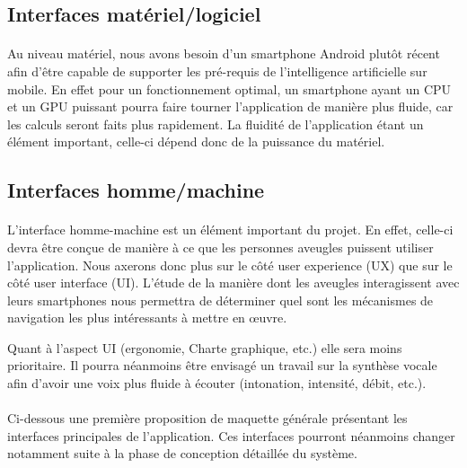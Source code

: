 \documentclass[CDS,UTF8,final]{EPURapport}
\begin{document}
\subsection{Interfaces matériel/logiciel}
\paragraph{}
Au niveau matériel, nous avons besoin d'un smartphone Android plutôt récent afin d'être capable de supporter les pré-requis de l'intelligence artificielle sur mobile. En effet pour un fonctionnement optimal, un smartphone ayant un CPU et un GPU puissant pourra faire tourner l'application de manière plus fluide, car les calculs seront faits plus rapidement. La fluidité de l'application étant un élément important, celle-ci dépend donc de la puissance du matériel.
 
\subsection{Interfaces homme/machine}
\paragraph{}
L'interface homme-machine est un élément important du projet. En effet, celle-ci devra être conçue de manière à ce que les personnes aveugles puissent utiliser l'application. Nous axerons donc plus sur le côté user experience (UX) que sur le côté user interface (UI). L'étude de la manière dont les aveugles interagissent avec leurs smartphones nous permettra de déterminer quel sont les mécanismes de navigation les plus intéressants à mettre en œuvre. \par
Quant à l'aspect UI (ergonomie, Charte graphique, etc.) elle sera moins prioritaire. Il pourra néanmoins être envisagé un travail sur la synthèse vocale afin d'avoir une voix plus fluide à écouter (intonation, intensité, débit, etc.).\par

\paragraph{}
Ci-dessous une première proposition de maquette générale présentant les interfaces principales de l'application. Ces interfaces pourront néanmoins changer notamment suite à la phase de conception détaillée du système.
\end{document}

